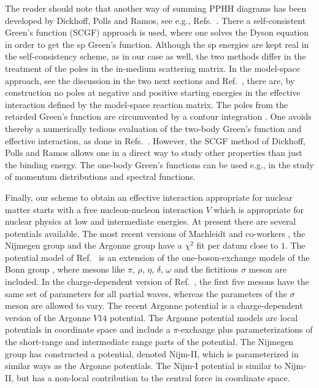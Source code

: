 The reader should note that another way of summing  PPHH diagrams has
been developed by Dickhoff, Polls and Ramos, see e.g., Refs.\ 
\cite{rpd89,rdp91,dm92}. There a self-consistent 
Green's function (SCGF) approach
is used, where one solves the Dyson equation in order to
get the sp Green's function. Although the sp
energies are kept real in the self-consistency scheme, 
as in our case as well,
the two methods differ in the treatment of the poles in the 
in-medium scattering matrix. In the model-space
approach, see the discussion in the two next sections
and Ref.\ \cite{shk87}, there are, by 
construction no poles 
at negative and positive starting energies 
in the effective interaction defined
by the model-space reaction matrix.  The poles 
from the retarded Green's function are circumvented by a contour 
integration \cite{shk87}.
One avoids thereby a numerically tedious evaluation
of the two-body Green's function and effective interaction, as done
in Refs.\  \cite{rpd89,rdp91,dm92}.
However, the SCGF method of Dickhoff, Polls and Ramos 
\cite{rpd89,rdp91,dm92} allows one in a direct way to study 
other properties than just the binding energy. The one-body Green's
functions can be used e.g., in the study of momentum distributions and
spectral functions. 

Finally,  
our scheme to obtain an effective interaction appropriate for 
nuclear matter
starts with a free nucleon-nucleon  interaction $V$ which is
appropriate for nuclear physics at low and intermediate energies. 
At present there are several potentials available. 
The most recent versions of Machleidt and co-workers
\cite{cdbonn}, the Nijmegen group \cite{nim} and the Argonne
group \cite{v18} have a $\chi^2$ fit per datum close to $1$. 
The potential
model of Ref.\ \cite{cdbonn} is an extension of the one-boson-exchange
models of the Bonn group \cite{mac89}, where mesons like 
$\pi$, $\rho$, $\eta$, $\delta$, $\omega$ and the fictitious
$\sigma$ meson are included. In the charge-dependent version
of Ref.\ \cite{cdbonn}, the first five mesons have the same set
of parameters for all partial waves, whereas the parameters of
the $\sigma$ meson are allowed to vary. The recent Argonne potential
\cite{v18} is a charge-dependent version of the Argonne
$V14$ \cite{v14} potential. The Argonne potential models 
are local potentials in coordinate space and include
a $\pi$-exchange plus parameterizations of the short-range
and intermediate range parts of the potential. The Nijmegen group   
\cite{nim}  has constructed a potential, denoted Nijm-II, which is   
parameterized in similar ways as the Argonne potentials.
The Nijm-I potential is similar to Nijm-II, but has a non-local 
contribution to the central force in coordinate space.

